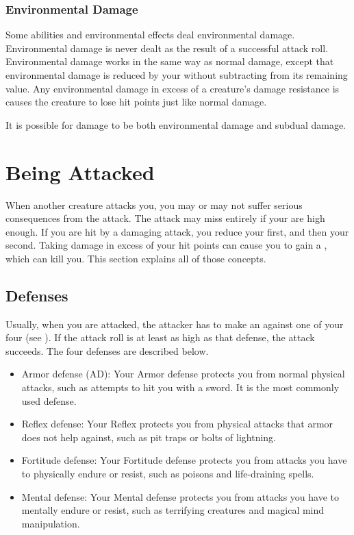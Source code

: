             \subsubsection{Environmental Damage}\label{Environmental Damage}
                Some abilities and environmental effects deal environmental damage.
                Environmental damage is never dealt as the result of a successful attack roll.
                Environmental damage works in the same way as normal damage, except that environmental damage is reduced by your  without subtracting from its remaining value.
                Any environmental damage in excess of a creature's damage resistance is causes the creature to lose hit points just like normal damage.

                It is possible for damage to be both environmental damage and subdual damage.

\section{Being Attacked}\label{Being Attacked}
    When another creature attacks you, you may or may not suffer serious consequences from the attack.
    The attack may miss entirely if your  are high enough.
    If you are hit by a damaging attack, you reduce your  first, and then your  second.
    Taking damage in excess of your hit points can cause you to gain a , which can kill you.
    This section explains all of those concepts.

    \subsection{Defenses}\label{Defenses}
        Usually, when you are attacked, the attacker has to make an  against one of your four  (see ).
        If the attack roll is at least as high as that defense, the attack succeeds.
        The four defenses are described below.
        \begin{itemize}
            \item Armor defense (AD): Your Armor defense protects you from normal physical attacks, such as attempts to hit you with a sword.
                It is the most commonly used defense.
            \item Reflex defense: Your Reflex protects you from physical attacks that armor does not help against, such as pit traps or bolts of lightning.
            \item Fortitude defense: Your Fortitude defense protects you from attacks you have to physically endure or resist, such as poisons and life-draining spells.
            \item Mental defense: Your Mental defense protects you from attacks you have to mentally endure or resist, such as terrifying creatures and magical mind manipulation.
        \end{itemize}

